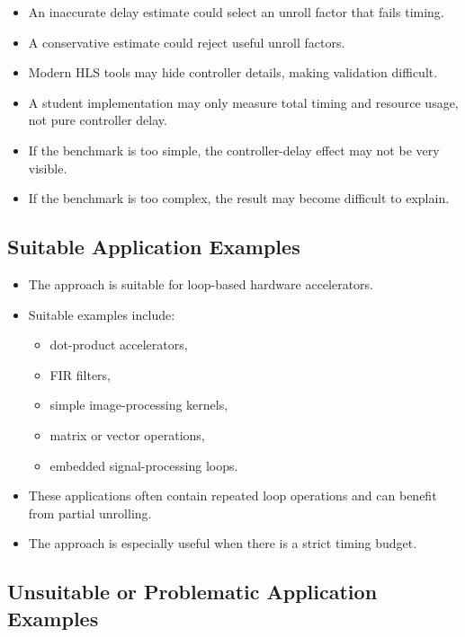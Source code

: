 \documentclass[conference]{IEEEtran}
\begin{document}
\begin{itemize}
    \item An inaccurate delay estimate could select an unroll factor that fails timing.
    \item A conservative estimate could reject useful unroll factors.
    \item Modern HLS tools may hide controller details, making validation difficult.
    \item A student implementation may only measure total timing and resource usage, not pure controller delay.
    \item If the benchmark is too simple, the controller-delay effect may not be very visible.
    \item If the benchmark is too complex, the result may become difficult to explain.
\end{itemize}

\subsection{Suitable Application Examples}

\begin{itemize}
    \item The approach is suitable for loop-based hardware accelerators.
    \item Suitable examples include:
    \begin{itemize}
        \item dot-product accelerators,
        \item FIR filters,
        \item simple image-processing kernels,
        \item matrix or vector operations,
        \item embedded signal-processing loops.
    \end{itemize}

    \item These applications often contain repeated loop operations and can benefit from partial unrolling.
    \item The approach is especially useful when there is a strict timing budget.
\end{itemize}

\subsection{Unsuitable or Problematic Application Examples}
\end{document}
